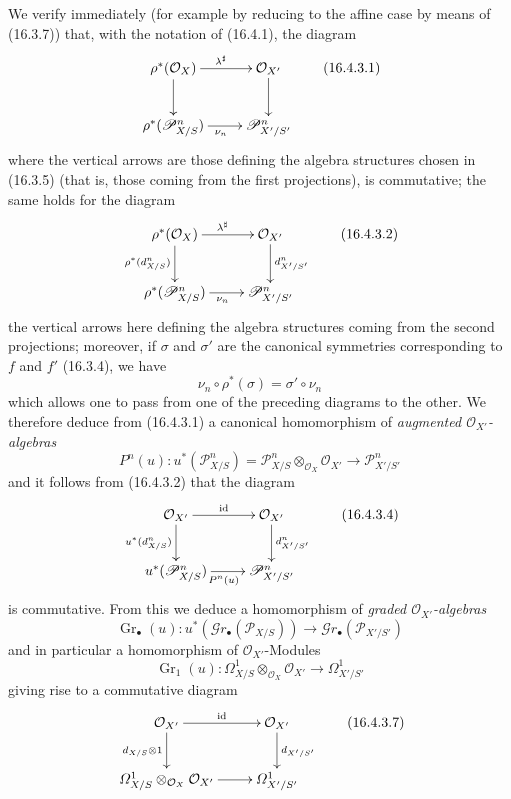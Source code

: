 \begin{env}[16.4.3]
\label{IV.16.4.3}
We verify immediately (for example by reducing to the affine case by means of
(16.3.7)) that, with the notation of (16.4.1), the diagram
\[
  \xymatrix{
    \rho^*(\mathcal{O}_X) \ar[r]^{\lambda^\sharp} \ar[d] &
      \mathcal{O}_{X'} \ar[d] \\
    \rho^*(\mathscr{P}_{X/S}^n) \ar[r]_{\nu_n} &
      \mathscr{P}_{X'/S'}^n
  }
  \tag{16.4.3.1}
  \label{IV.16.4.3.1}
\]
where the vertical arrows are those defining the algebra structures
chosen in (16.3.5) (that is, those coming from the first projections),
is commutative; the same holds for the diagram
\[
  \xymatrix{
    \rho^*(\mathcal{O}_X) \ar[r]^{\lambda^\sharp}
      \ar[d]_{\rho^*(d_{X/S}^n)} &
      \mathcal{O}_{X'} \ar[d]^{d_{X'/S'}^n} \\
    \rho^*(\mathscr{P}_{X/S}^n) \ar[r]_{\nu_n} &
      \mathscr{P}_{X'/S'}^n
  }
  \tag{16.4.3.2}
  \label{IV.16.4.3.2}
\]
the vertical arrows here defining the algebra structures coming from the
second projections; moreover, if $\sigma$ and $\sigma'$ are the canonical
symmetries corresponding to $f$ and $f'$ (16.3.4), we have
\[
  \nu_n\circ\rho^*(\sigma)=\sigma'\circ\nu_n
\]
which allows one to pass from one of the preceding diagrams to the other. We
therefore deduce from (16.4.3.1) a canonical homomorphism of \emph{augmented
$\mathcal{O}_{X'}$-algebras}
\[
  P^n(u):u^*(\mathscr{P}_{X/S}^n)
  =\mathscr{P}_{X/S}^n\otimes_{\mathcal{O}_X}\mathcal{O}_{X'}
  \longrightarrow\mathscr{P}_{X'/S'}^n
  \tag{16.4.3.3}
  \label{IV.16.4.3.3}
\]
and it follows from (16.4.3.2) that the diagram
\[
  \xymatrix{
    \mathcal{O}_{X'} \ar[r]^{\operatorname{id}}
      \ar[d]_{u^*(d_{X/S}^n)} &
      \mathcal{O}_{X'} \ar[d]^{d_{X'/S'}^n} \\
    u^*(\mathscr{P}_{X/S}^n) \ar[r]_{P^n(u)} &
      \mathscr{P}_{X'/S'}^n
  }
  \tag{16.4.3.4}
  \label{IV.16.4.3.4}
\]
is commutative. From this we deduce a homomorphism of \emph{graded
$\mathcal{O}_{X'}$-algebras}
\[
  \operatorname{Gr}_\bullet(u):u^*(\mathscr{G}r_\bullet(\mathscr{P}_{X/S}))
  \longrightarrow\mathscr{G}r_\bullet(\mathscr{P}_{X'/S'})
  \tag{16.4.3.5}
  \label{IV.16.4.3.5}
\]
and in particular a homomorphism of $\mathcal{O}_{X'}$-Modules
\[
  \operatorname{Gr}_1(u):
  \varOmega_{X/S}^1\otimes_{\mathcal{O}_X}\mathcal{O}_{X'}
  \longrightarrow\varOmega_{X'/S'}^1
  \tag{16.4.3.6}
  \label{IV.16.4.3.6}
\]
giving rise to a commutative diagram
\[
  \xymatrix{
    \mathcal{O}_{X'} \ar[r]^{\operatorname{id}}
      \ar[d]_{d_{X/S}\otimes 1} &
      \mathcal{O}_{X'} \ar[d]^{d_{X'/S'}} \\
    \varOmega_{X/S}^1\otimes_{\mathcal{O}_X}\mathcal{O}_{X'} \ar[r] &
      \varOmega_{X'/S'}^1
  }
  \tag{16.4.3.7}
  \label{IV.16.4.3.7}
\]
\end{env}

